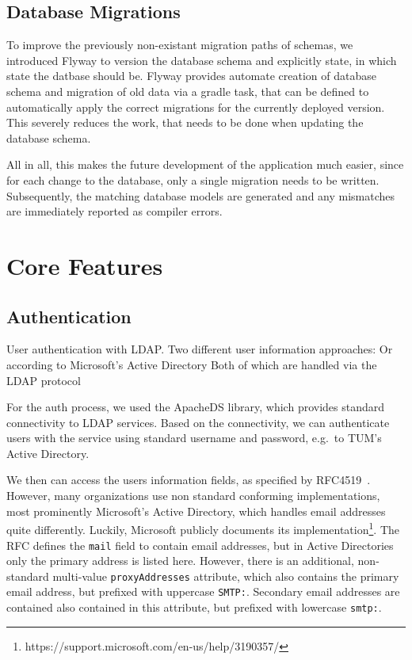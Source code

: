 \subsection*{Database Migrations}
To improve the previously non-existant migration paths of schemas, we introduced Flyway to version the database schema
and explicitly state, in which state the datbase should be.
Flyway provides automate creation of database schema and migration of old data via a gradle task, that can be defined to
automatically apply the correct migrations for the currently deployed version.
This severely reduces the work, that needs to be done when updating the database schema.

All in all, this makes the future development of the application much easier, since for each change to the database,
only a single migration needs to be written.
Subsequently, the matching database models are generated and any mismatches are immediately reported as compiler errors.

\section{Core Features}\label{sec:coreFeatures}


\subsection*{Authentication}
User authentication with LDAP. %
Two different user information approaches:
Or according to Microsoft's Active Directory
Both of which are handled via the LDAP protocol %

For the auth process, we used the ApacheDS library, which provides standard connectivity to LDAP services.
Based on the connectivity, we can authenticate users with the service using standard username and password, e.g.\ to
TUM's Active Directory.

We then can access the users information fields, as specified by RFC4519~\cite{RFC4519}.
However, many organizations use non standard conforming implementations, most prominently Microsoft's Active Directory,
which handles email addresses quite differently.
Luckily, Microsoft publicly documents its implementation\footnote{https://support.microsoft.com/en-us/help/3190357/}.
The RFC defines the \lstinline{mail} field to contain email addresses, but in Active Directories only the primary
address is listed here.
However, there is an additional, non-standard multi-value \lstinline{proxyAddresses} attribute, which also contains the
primary email address, but prefixed with uppercase \lstinline{SMTP:}.
Secondary email addresses are contained also contained in this attribute, but prefixed with lowercase \lstinline{smtp:}.

